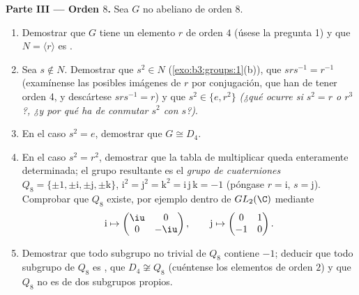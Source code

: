 \begin{problem}
\medskip
\noindent\textbf{Parte III --- Orden $8$.} Sea $G$ no abeliano de orden
$8$.
\begin{enumerate}[resume]
  \item Demostrar que $G$ tiene un elemento $r$ de orden $4$ (úsese la
  pregunta 1) y que $N = \langle r\rangle$ es
  . \item Sea $s \notin N$.
  Demostrar que $s^2 \in N$ (\cref{exo:b3:groups:1}(b)), que
  $srs^{-1} = r^{-1}$ (examínense las posibles imágenes de $r$ por
  conjugación, que han de tener orden 4, y descártese $srs^{-1} = r$) y
  que $s^2 \in \{e, r^2\}$ \emph{(¿qué ocurre si $s^2 = r$ o $r^3$?, ¿y
  por qué ha de conmutar $s^2$ con $s$?)}. \item En el caso $s^2 = e$,
  demostrar que $G \cong D_4$. \item En el caso $s^2 = r^2$, demostrar
  que la tabla de multiplicar queda enteramente determinada; el grupo
  resultante es el \emph{grupo de cuaterniones} $Q_8 =
        \{\pm 1, \pm \mathrm i, \pm \mathrm j, \pm \mathrm k\}$,
  $\mathrm i^2 = \mathrm j^2 = \mathrm k^2 = \mathrm i\,
        \mathrm j\,\mathrm k = -1$ (póngase $r = \mathrm i$, $s =
        \mathrm j$). Comprobar que $Q_8$ existe, por ejemplo dentro de
  $GL_2(\C)$ mediante
        \[
        \mathrm i \mapsto \begin{pmatrix} \iu & 0\\ 0 & -\iu
        \end{pmatrix},
        \qquad
        \mathrm j \mapsto \begin{pmatrix} 0 & 1\\ -1 & 0
        \end{pmatrix}.
        \]
  \item Demostrar que todo subgrupo no trivial de $Q_8$ contiene $-1$;
  deducir que todo subgrupo de $Q_8$ es
  , que $D_4 \not\cong Q_8$
  (cuéntense los elementos de orden $2$) y que $Q_8$ no es
   de dos
  subgrupos propios.
\end{enumerate}


\end{problem}
